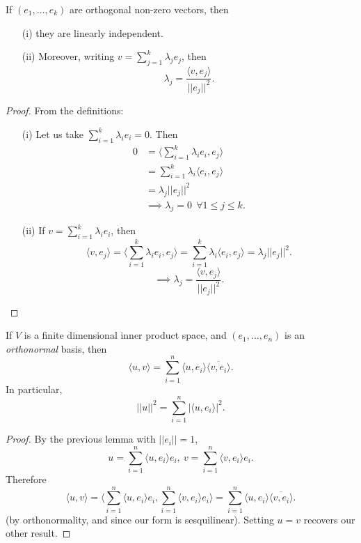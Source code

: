 \documentclass[a4paper]{scrartcl}
\begin{document}
\begin{lemma}
      If $\left(e_1, \ldots , e_k\right)$ are orthogonal non-zero vectors, then 
      \begin{itemize}
           \item[(i)] they are linearly independent.
           \item[(ii)] Moreover, writing $v=\sum_{j=1}^{k}\lambda_j e_j$, then 
           \[\lambda_j=\frac{\langle v,e_j \rangle  }{||e_j||^2}.\]
      \end{itemize} 
\end{lemma}
\begin{proof}
     From the definitions:
     \begin{itemize}
          \item[(i)]Let us take $\sum_{i=1}^{k}\lambda_i e_i=0$. Then
          \begin{align*}
               0&= \langle \sum_{i=1}^{k}\lambda_i e_i,e_j \rangle \\&=\sum_{i=1}^{k}\lambda_i \langle e_i,e_j \rangle \\&= \lambda_j ||e_j||^2 \\&\implies \lambda_j=0 \ \ \forall 1 \leq j \leq k.
          \end{align*}
          \item[(ii)] If $v=\sum_{i=1}^{k}\lambda_i e_i$, then 
          \[\langle v,e_j \rangle  =\langle \sum_{i=1}^{k}\lambda_i e_i,e_j \rangle=\sum_{i=1}^{k}\lambda_i \langle e_i,e_j \rangle  =\lambda_j ||e_j||^2 .\]
          \[\implies \lambda_j=\frac{\langle v,e_j \rangle  }{||e_j||^2}.\]
     \end{itemize}
      
\end{proof}

\begin{lemma}
      If $V$ is a finite dimensional inner product space, and $\left(e_1, \ldots ,e_n\right)$ is an \emph{orthonormal} basis, then 
      \[\langle u,v \rangle  =\sum_{i=1}^{n}\langle u,e_i \rangle  \overline{\langle v,e_i \rangle  } .\]
      In particular, 
      \[||u||^2 =\sum_{i=1}^{n}|\langle u,e_i \rangle |^2.\]
\end{lemma}

\begin{proof}
     By the previous lemma with $||e_i||=1$, 
     \[u= \sum_{i=1}^{n}\langle u,e_i \rangle   e_i, \ v= \sum_{i=1}^{n}\langle v,e_i \rangle  e_i.\]
     Therefore 
     \[\langle u,v \rangle  =\langle \sum_{i=1}^{n}\langle u,e_i \rangle   e_i,\sum_{i=1}^{n}\langle v,e_i \rangle  e_i \rangle=\sum_{i=1}^{n}\langle u,e_i \rangle  \overline{\langle v,e_i \rangle  }.\]
     (by orthonormality, and since our form is sesquilinear). Setting $u=v$ recovers our other result.
\end{proof}
\end{document}
